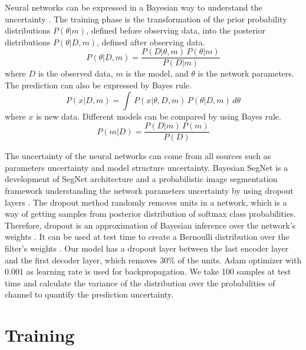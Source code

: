 Neural networks can be expressed in a Bayesian way to understand the uncertainty \cite[]{bayes}. The training phase is the transformation of the prior probability distributions $P(\theta|m)$, defined before observing data, into the posterior distributions $P(\theta|D,m)$, defined after observing data. 
\begin{equation}
P(\theta|D,m) = \frac{P(D|\theta,m)\,P(\theta|m)}{P(D|m)}
\end{equation}
where $D$ is the observed data, $m$ is the model, and $\theta$ is the network parameters. The prediction can also be expressed by Bayes rule.
\begin{equation}
P(x|D,m) = \int\,P(x|\theta,D,m)\,P(\theta|D,m)\,d\theta
\end{equation}
where $x$ is new data. Different models can be compared by using Bayes rule.
\begin{equation}
P(m|D) = \frac{P(D|m)\,P(m)}{P(D)}
\end{equation}

The uncertainty of the neural networks can come from all sources such as parameters uncertainty and model structure uncertainty. Bayesian SegNet is a development of SegNet architecture and a probabilistic image segmentation framework understanding the network parameters uncertainty by using dropout layers \cite[]{bayesianSegNet}. The dropout method randomly removes units in a network, which is a way of getting samples from posterior distribution of softmax class probabilities. Therefore, dropout is an approximation of Bayesian inference over the network's weights \cite[]{gal2015dropout}. It can be used at test time to create a Bernoulli distribution over the filter's weights \cite[]{Gal2015BayesianCN}. Our model has a dropout layer between the last encoder layer and the first decoder layer, which removes 30\% of the units. Adam optimizer \cite[]{adam} with 0.001 as learning rate is used for backpropagation. We take 100 samples at test time and calculate the variance of the distribution over the probabilities of channel to quantify the prediction uncertainty.

\section{Training}
